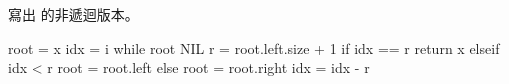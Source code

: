\startEXERCISE
寫出  的非遞迴版本。
\stopEXERCISE

\startANSWER
{}
\startCLRSCODE
root = x
idx = i
while root \ne NIL
	r = root.left.size + 1
	if idx == r
		return x
	elseif idx < r
		root = root.left
	else
		root = root.right
		idx = idx - r
\stopCLRSCODE
\stopANSWER
